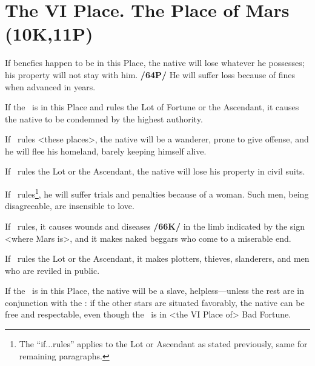 \section{The VI Place. The Place of Mars (10K,11P)}
If benefics happen to be in this Place, the native will lose whatever he possesses; his property will not stay with him. \textbf{/64P/} He will suffer loss because of fines when advanced in years. 

If the \Sun\, is in this Place and rules the Lot of Fortune or the Ascendant, it causes the native to be condemned by the highest authority. 

If \Saturn\, rules <these places>, the native will be a wanderer, prone to give offense, and he will flee his homeland, barely keeping himself alive. 

If \Jupiter\, rules the Lot or the Ascendant, the native will lose his property in civil suits. 

If \Venus\, rules\footnote{The ``if...rules'' applies to the Lot or Ascendant as stated previously, same for remaining paragraphs.}, he will suffer trials and penalties because of a woman. Such men, being disagreeable, are insensible to love. 

If \Mars\, rules, it causes wounds and diseases \textbf{/66K/} in the limb indicated by the sign <where Mars is>, and it makes naked beggars who come to a miserable end. 

If \Mercury\, rules the Lot or the Ascendant, it makes plotters, thieves, slanderers, and men who are reviled in public. 

If the \Moon\, is in this Place, the native will be a slave, helpless—unless the rest are in conjunction with the \Moon: if the other stars are situated favorably, the native can be free and respectable, even though the \Moon\, is in <the VI Place of> Bad Fortune.

\newpage